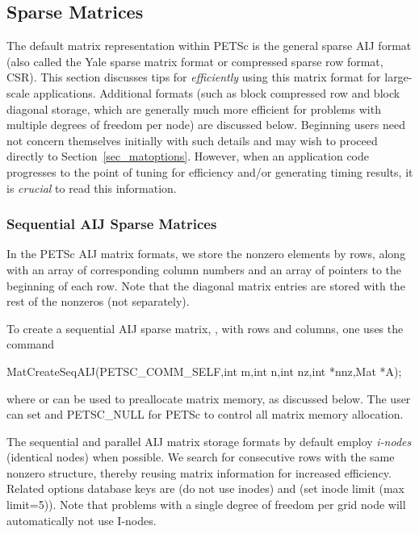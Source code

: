 \subsection{Sparse Matrices}
\label{sec_matsparse}

 
The default matrix representation within PETSc is the general sparse
AIJ format (also called the Yale sparse matrix format or compressed
sparse row format, CSR).  This section discusses tips for {\em
efficiently} using this matrix format for large-scale
applications. Additional formats (such as block compressed row and
block diagonal storage, which are generally much more efficient for
problems with multiple degrees of freedom per node) are discussed
below.  Beginning users need not concern themselves initially with
such details and may wish to proceed directly to
Section~\ref{sec_matoptions}.  However, when an application code
progresses to the point of tuning for efficiency and/or generating
timing results, it is {\em crucial} to read this information.

\subsubsection{Sequential AIJ Sparse Matrices}

In the PETSc AIJ matrix formats, we store the nonzero elements
by rows, along with an array of corresponding column numbers and
an array of pointers to the beginning of each row.  Note that the
diagonal matrix entries are stored with the rest of the nonzeros (not
separately).

To create a sequential AIJ sparse matrix, ,
with  rows and  columns,
one uses the command
\begin{tabbing}
  MatCreateSeqAIJ(PETSC\_COMM\_SELF,int m,int n,int nz,int *nnz,Mat *A);
\end{tabbing}
where  or  can be used to preallocate matrix memory,
as discussed below. The user can set  and PETSC\_NULL for PETSc to control all matrix memory allocation.

The sequential and parallel AIJ matrix storage formats by default
employ {\em i-nodes} (identical nodes) when possible.  We search for
consecutive rows with the same nonzero structure, thereby reusing
matrix information for increased efficiency.  Related options database
keys are  (do not use inodes) and  (set inode limit (max limit=5)).
Note that problems with a single degree of freedom per grid node
will automatically not use I-nodes.

